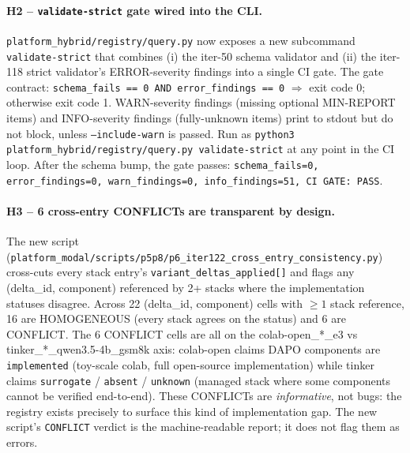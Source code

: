 \paragraph{H2 -- \texttt{validate-strict} gate wired into the CLI.}
\texttt{platform_hybrid/registry/query.py} now exposes a new subcommand
\texttt{validate-strict} that combines (i) the iter-50 schema validator
and (ii) the iter-118 strict validator's ERROR-severity findings into a
single CI gate. The gate contract: \texttt{schema\_fails == 0 AND
error\_findings == 0} $\Rightarrow$ exit code 0; otherwise exit code 1.
WARN-severity findings (missing optional MIN-REPORT items) and
INFO-severity findings (fully-unknown items) print to stdout but do not
block, unless \texttt{--include-warn} is passed. Run as
\texttt{python3 platform_hybrid/registry/query.py validate-strict} at any point in the
CI loop. After the schema bump, the gate passes:
\texttt{schema\_fails=0, error\_findings=0, warn\_findings=0,
info\_findings=51, CI GATE: PASS}.

\paragraph{H3 -- 6 cross-entry CONFLICTs are transparent by design.}
The new script
(\texttt{platform_modal/scripts/p5p8/p6\_iter122\_cross\_entry\_consistency.py})
cross-cuts every stack entry's \texttt{variant\_deltas\_applied[]} and
flags any (delta\_id, component) referenced by 2+ stacks where the
implementation statuses disagree. Across 22 (delta\_id, component)
cells with $\geq 1$ stack reference, 16 are HOMOGENEOUS (every stack
agrees on the status) and 6 are CONFLICT. The 6 CONFLICT cells are all
on the colab-open\_*\_e3 vs tinker\_*\_qwen3.5-4b\_gsm8k axis: colab-open
claims DAPO components are \texttt{implemented} (toy-scale colab, full
open-source implementation) while tinker claims
\texttt{surrogate} / \texttt{absent} / \texttt{unknown} (managed stack
where some components cannot be verified end-to-end). These CONFLICTs
are \emph{informative}, not bugs: the registry exists precisely to
surface this kind of implementation gap. The new script's
\texttt{CONFLICT} verdict is the machine-readable report; it does not
flag them as errors.

